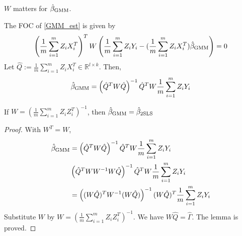 \documentclass[11pt]{elegantbook}
\begin{document}
\begin{remark}
    $W$ matters for $\hat{\beta}_\textnormal{GMM}$.
\end{remark}
The FOC of \eqref{GMM_est} is given by
\begin{equation}
    \begin{aligned}
        \left(\frac{1}{m}\sum_{i=1}^mZ_iX_i^T\right)^TW\left(\frac{1}{m}\sum_{i=1}^mZ_iY_i-(\frac{1}{m}\sum_{i=1}^mZ_iX_i^T)\hat{\beta}_\textnormal{GMM}\right)=0
    \end{aligned}
    \nonumber
\end{equation}
Let $\hat{Q}:=\frac{1}{m}\sum_{i=1}^mZ_iX_i^T\in \mathbb{R}
^{l\times k}$. Then,
\begin{equation}
    \begin{aligned}
        \hat{\beta}_\textnormal{GMM}=\left(\hat{Q}^TW\hat{Q}\right)^{-1}\hat{Q}^TW\frac{1}{m}\sum_{i=1}^mZ_iY_i
    \end{aligned}
    \nonumber
\end{equation}
\begin{lemma}
    If $W=(\frac{1}{m}\sum_{i=1}^mZ_iZ_i^T)^{-1}$, then $\hat{\beta}_\textnormal{GMM}=\hat{\beta}_\textnormal{2SLS}$
\end{lemma}
\begin{proof}
    With $W^T=W$,
    \begin{equation}
        \begin{aligned}
            \hat{\beta}_\textnormal{GMM}&=\left(\hat{Q}^TW\hat{Q}\right)^{-1}\hat{Q}^TW\frac{1}{m}\sum_{i=1}^mZ_iY_i\\
            &\left(\hat{Q}^TWW^{-1}W\hat{Q}\right)^{-1}\hat{Q}^TW\frac{1}{m}\sum_{i=1}^mZ_iY_i\\
            &=\left((W\hat{Q})^TW^{-1}(W\hat{Q})\right)^{-1}(W\hat{Q})^T\frac{1}{m}\sum_{i=1}^mZ_iY_i\\
        \end{aligned}
        \nonumber
    \end{equation}
    Substitute $W$ by $W=(\frac{1}{m}\sum_{i=1}^mZ_iZ_i^T)^{-1}$. We have $W\hat{Q}=\hat{\Gamma}$. The lemma is proved.
\end{proof}
\end{document}

